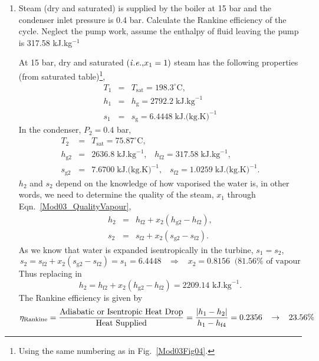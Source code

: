 \begin{enumerate}
\clearpage
    
\clearpage
 
\item\label{Mod03Ex06} Steam (dry and saturated) is supplied by the boiler at 15 bar and the condenser inlet pressure is 0.4 bar. Calculate the Rankine efficiency of the cycle. Neglect the pump work, assume the enthalpy of fluid leaving the pump is 317.58 kJ.kg$^{-1}$

     At 15 bar, dry and saturated $\left({\it i.e., } x_{1}=1\right)$ steam has the following properties (from saturated table)\footnote{Using the same numbering as in Fig.~\ref{Mod03Fig04}.},
          \begin{eqnarray}
             T_{1} &=& T_{\text{sat}} = 198.3^{\circ}\text{C},\nonumber \\
             h_{1} &=& h_{\text{g}} = 2792.2\; \text{kJ.kg}^{-1} \nonumber \\
             s_{1} &=& s_{\text{g}} = 6.4448\; \text{kJ.(kg.K)}^{-1} \nonumber
          \end{eqnarray} 
    In the condenser, $P_{2}=0.4$ bar,
          \begin{eqnarray}
              T_{2} &=& T_{\text{sat}} = 75.87^{\circ}\text{C}, \nonumber \\
              h_{\text{g}2} &=& 2636.8\;\text{kJ.kg}^{-1},\;\;\; h_{\text{f}2} = 317.58\;\text{kJ.kg}^{-1},  \nonumber \\
              s_{\text{g}2} &=& 7.6700 \;\text{kJ.(kg.K)}^{-1},\;\;\; s_{\text{f}2} = 1.0259\;\text{kJ.(kg.K)}^{-1}. \nonumber  
          \end{eqnarray}
$h_{2}$ and $s_{2}$ depend on the knowledge of how vaporised the water is, in other words, we need to determine the quality of the steam, $x_{1}$ through Eqn.~\ref{Mod03_QualityVapour},
      \begin{eqnarray}
          h_{2} &=& h_{\text{f}2} + x_{2}\left(h_{\text{g}2} - h_{\text{f}2}\right), \nonumber \\
          s_{2} &=& s_{\text{f}2} + x_{2}\left(s_{\text{g}2} - s_{\text{f}2}\right). \nonumber
      \end{eqnarray}
As we know that water is expanded isentropically in the turbine, \ie $s_{1}=s_{2}$,
      \begin{displaymath}
         s_{2} = s_{\text{f}2} + x_{2}\left(s_{\text{g}2} - s_{\text{f}2}\right) = s_{1} = 6.4448 \;\;\;\Rightarrow \;\;\; x_{2} = 0.8156 \;\;(81.56\% \text{ of vapour}
      \end{displaymath}
Thus replacing in 
      \begin{displaymath}
          h_{2} = h_{\text{f}2} + x_{2}\left(h_{\text{g}2} - h_{\text{f}2}\right) = 2209.14\text{ kJ.kg}^{-1}.
      \end{displaymath}
The Rankine efficiency is given by
      \begin{displaymath}
           \eta_{\text{Rankine}} = \displaystyle\frac{\text{Adiabatic or Isentropic Heat Drop}}{\text{Heat Supplied}} = \displaystyle\frac{\left|h_{1}-h_{2}\right|}{h_{1}-h_{\text{f}4}} = 0.2356\;\;\;\rightarrow \;\;\; 23.56\%
      \end{displaymath}
    


\end{enumerate}


